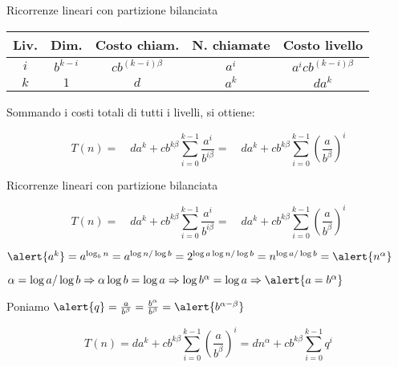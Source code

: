 \begin{frame}{Ricorrenze lineari con partizione bilanciata}

\bgroup
\begin{center}
\def\arraystretch{1.1}
\begin{tabular}{|c|c|c|c|c|}
\hline
\textbf{Liv.} & \textbf{Dim.} & \textbf{Costo chiam.} & \textbf{N. chiamate} & \textbf{Costo livello} \\\hline
$i$  & $b^{k-i}$ & $cb^{(k-i)\beta}$ & $a^i$& $a^icb^{(k-i)\beta}$ \\
\hline
$k$ & $1$ & $d$ & $a^k$ &$da^k$ \\
\hline
\end{tabular}
\end{center}
\egroup

\begin{mybox}
Sommando i costi totali di tutti i livelli, si ottiene:

\[
T(n) =\quad da^k + cb^{k\beta} \sum_{i=0}^{k-1} \frac{a^i}{b^{i\beta}} =\quad da^k + cb^{k\beta} \sum_{i=0}^{k-1} \left(\frac{a}{b^{\beta}}\right)^i
\]
\end{mybox}

\end{frame}

\begin{frame}{Ricorrenze lineari con partizione bilanciata}

\begin{mybox}
\[
T(n) =\quad da^k + cb^{k\beta} \sum_{i=0}^{k-1} \frac{a^i}{b^{i\beta}} =\quad da^k + cb^{k\beta} \sum_{i=0}^{k-1} \left(\frac{a}{b^{\beta}}\right)^i
\]
\end{mybox}

\begin{myboxtitle}[Osservazioni]
\BIL
\item $\alert{a^k} = a^{\log_b n} = a^{\log n / \log b} = 2^{\log a \log n / \log b}=
n^{\log a / \log b} = \alert{n^\alpha}$
\item $\alpha = \log a / \log b \Rightarrow \alpha \log b = \log a \Rightarrow \log b^\alpha = \log a \Rightarrow \alert{a= b^{\alpha}}$
\item Poniamo $\alert{q} = \frac{a}{b^\beta} = \frac{b^\alpha}{b^\beta} = \alert{b^{\alpha-\beta}}$
\EIL
\end{myboxtitle}

\begin{mybox}
\[
T(n) = da^k + cb^{k\beta} \sum_{i=0}^{k-1} \left(\frac{a}{b^{\beta}}\right)^i = dn^\alpha  + cb^{k\beta} \sum_{i=0}^{k-1} q^i
\]
\end{mybox}
	
\end{frame}

